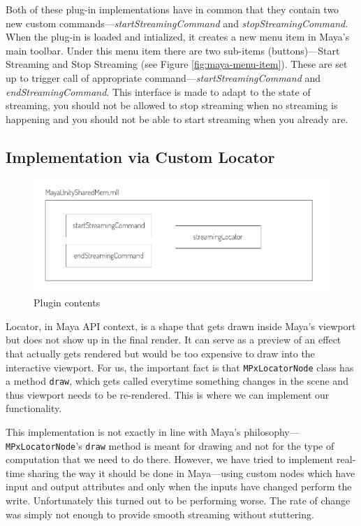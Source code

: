 \documentclass[
  digital, %
  table,   %
  nolof,     %
  nolot,     %
  oneside,
]{fithesis3}
\begin{document}
Both of these plug-in implementations have in common that they contain two new custom commands—\textit{startStreamingCommand} and \textit{stopStreamingCommand}. When the plug-in is loaded and intialized, it creates a new menu item in Maya's main toolbar. Under this menu item there are two sub-items (buttons)—Start Streaming and Stop Streaming (see Figure \ref{fig:maya-menu-item}). These are set up to trigger call of appropriate command—\textit{startStreamingCommand} and \textit{endStreamingCommand}. This interface is made to adapt to the state of streaming, you should not be allowed to stop streaming when no streaming is happening and you should not be able to start streaming when you already are.

\subsection{Implementation via Custom Locator}
\begin{figure}
  \centering
  \includegraphics[scale=0.8]{images/plugin-contents.pdf}
  \caption{Plugin contents}
  \label{fig:plugin-content}
\end{figure}
Locator, in Maya API context, is a shape that gets drawn inside Maya's viewport but does not show up in the final render. It can serve as a preview of an effect that actually gets rendered but would be too expensive to draw into the interactive viewport. For us, the important fact is that \texttt{MPxLocatorNode} class has a method \texttt{draw}, which gets called everytime something changes in the scene and thus viewport needs to be re-rendered. This is where we can implement our functionality.

This implementation is not exactly in line with Maya's philosophy—\texttt{MPxLocatorNode}'s \texttt{draw} method is meant for drawing and not for the type of computation that we need to do there. However, we have tried to implement real-time sharing the way it should be done in Maya—using custom nodes which have input and output attributes and only when the inputs have changed perform the write. Unfortunately this turned out to be performing worse. The rate of change was simply not enough to provide smooth streaming without stuttering.
\end{document}
